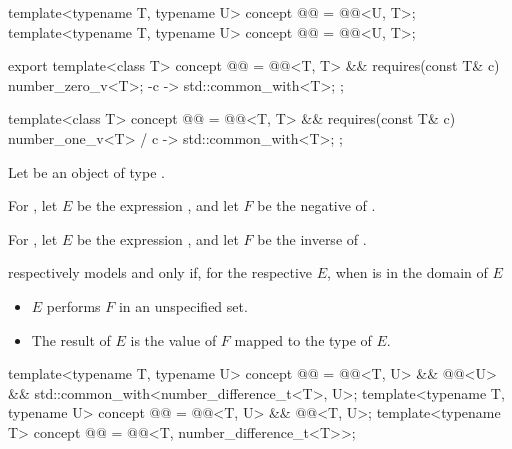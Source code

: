 \begin{itemdecl}
template<typename T, typename U>
concept @@ = @@<U, T>;
template<typename T, typename U>
concept @@ = @@<U, T>;
\end{itemdecl}

\begin{itemdecl}
export template<class T> concept @@ =
  @@<T, T> &&
  requires(const T& c) {
    number_zero_v<T>;
    { -c } -> std::common_with<T>;
  };

template<class T> concept @@ =
  @@<T, T> &&
  requires(const T& c) {
    { number_one_v<T> / c } -> std::common_with<T>;
  };
\end{itemdecl}

\begin{itemdescr}
\pnum
Let  be an object of type .

\pnum
For ,
let $E$ be the expression , and
let $F$ be the negative of .

\pnum
For ,
let $E$ be the expression , and
let $F$ be the inverse of .

\pnum
{} respectively models
 and
only if, for the respective $E$, when  is in the domain of $E$
\begin{itemize}
\item
$E$ performs $F$ in an unspecified set.
\item
The result of $E$ is the value of $F$ mapped to the type of $E$.
\end{itemize}
\end{itemdescr}

\begin{itemdecl}
template<typename T, typename U>
concept @@ =
  @@<T, U> && @@<U> && std::common_with<number_difference_t<T>, U>;
template<typename T, typename U>
concept @@ = @@<T, U> && @@<T, U>;
template<typename T>
concept @@ = @@<T, number_difference_t<T>>;
\end{itemdecl}

